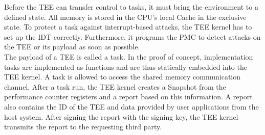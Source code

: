 Before the TEE can transfer control to tasks, it must bring the environment to a
defined state. All memory is stored in the CPU's local Cache in the exclusive
state. To protect a task against interrupt-based attacks, the TEE kernel has to
set up the IDT correctly. Furthermore, it programs the PMC to detect attacks on
the TEE or its payload as soon as possible. \\

The payload of a TEE is called a task. In the proof of concept, implementation
tasks are implemented as functions and are thus statically embedded into the TEE
kernel. A task is allowed to access the shared memory communication channel.
After a task run, the TEE kernel creates a Snapshot from the performance counter
registers and a report based on this information. A report also contains the ID
of the TEE and data provided by user applications from the host system. After
signing the report with the signing key, the TEE kernel transmits the report to
the requesting third party.

